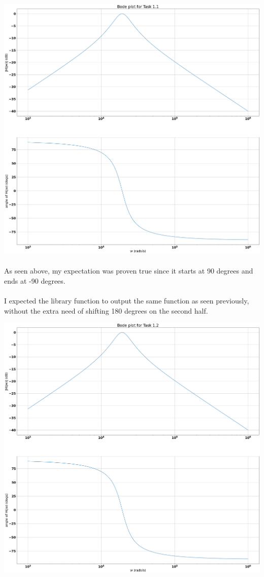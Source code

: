 \documentclass[12pt]{report}
\begin{document}
    \includegraphics[scale=0.25]{Figure 2022-03-29 221910 (0).png}
    
    \paragraph{} As seen above, my expectation was proven true since it starts at 90 degrees and ends at -90 degrees.  

    \paragraph{} I expected the library function to output the same function as seen previously, without the extra need of shifting 180 degrees on the second half.   
    
    \includegraphics[scale=0.25]{Figure 2022-03-29 221910 (1).png}
    
\end{document}
